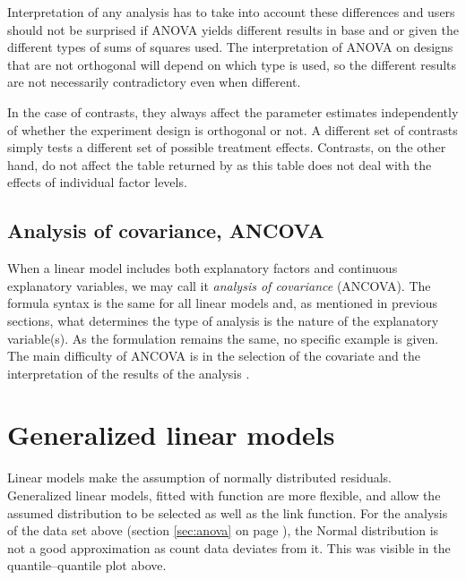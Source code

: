 \documentclass[krantz2]{krantz}\usepackage{knitr}
\begin{document}
\begin{warningbox}
Interpretation of any analysis has to take into account these differences and users should not be surprised if ANOVA yields different results in base \Rlang and  or  given the different types of sums of squares used. The interpretation of ANOVA on designs that are not orthogonal will depend on which type is used, so the different results are not necessarily contradictory even when different.

In the case of contrasts, they always affect the parameter estimates independently of whether the experiment design is orthogonal or not. A different set of contrasts simply tests a different set of possible treatment effects. Contrasts, on the other hand, do not affect the table returned by  as this table does not deal with the effects of individual factor levels.
\end{warningbox}

\subsection{Analysis of covariance, ANCOVA}

When a linear model includes both explanatory factors and continuous explanatory variables, we may call it \emph{analysis of covariance} (ANCOVA). The formula syntax is the same for all linear models and, as mentioned in previous sections, what determines the type of analysis is the nature of the explanatory variable(s). As the formulation remains the same, no specific example is given. The main difficulty of ANCOVA is in the selection of the covariate and the interpretation of the results of the analysis \autocite[e.g.][]{Smith1957}.

\section{Generalized linear models}\label{sec:stat:GLM}

Linear models make the assumption of normally distributed residuals. Generalized linear models, fitted with function  are more flexible, and allow the assumed distribution to be selected as well as the link function.
For the analysis of the  data set above (section \ref{sec:anova} on page \pageref{sec:anova}), the Normal distribution is not a good approximation as count data deviates from it. This was visible in the quantile--quantile plot above.
\end{document}
